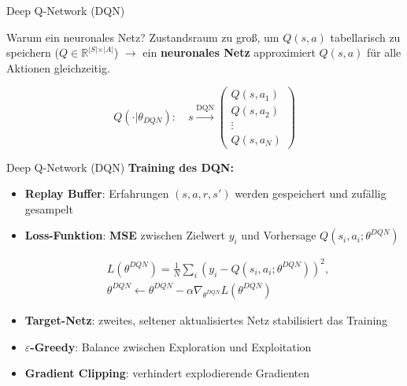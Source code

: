 \documentclass[aspectratio=169]{beamer}
\begin{document}
\begin{frame}{Deep Q-Network (DQN)}

  \begin{block}{Warum ein neuronales Netz?}
    Zustandsraum zu groß, um $Q(s,a)$ tabellarisch zu speichern ($Q \in \mathbb{R}^{\vert S \vert \times \vert A \vert}$)
    $\rightarrow$ ein \textbf{neuronales Netz} approximiert $Q(s,a)$ für alle Aktionen gleichzeitig.
  \end{block}

  \bigskip
  \begin{mdframed}[backgroundcolor=gray!20, , hidealllines=true]
    $$
      Q(\cdot \vert \theta_{DQN}): \quad s \xrightarrow{\text{DQN}}   \begin{pmatrix} Q(s, a_1) \\ Q(s, a_2) \\ \vdots \\ Q(s, a_N) \end{pmatrix}
    $$
\end{mdframed}

\end{frame}
\begin{frame}{Deep Q-Network (DQN)}
  \textbf{Training des DQN:}
  \begin{itemize}
    \item \textbf{Replay Buffer}: Erfahrungen $(s, a, r, s')$ werden gespeichert und zufällig
          gesampelt
    \item \textbf{Loss-Funktion}: \textbf{MSE} zwischen Zielwert $y_i$ und Vorhersage $Q(s_i, a_i; \theta^{DQN})$
  \begin{mdframed}[backgroundcolor=gray!20, , hidealllines=true]
    \begin{equation*}
        \begin{split}
             &L(\theta^{DQN}) = \frac{1}{N} \sum_{i} (y_i - Q(s_i, a_i; \theta^{DQN}))^2, \\
            &\theta^{DQN} \leftarrow \theta^{DQN} - \alpha \nabla_{\theta^{DQN}} L(\theta^{DQN})
        \end{split}
  \end{equation*}
  \end{mdframed} 
    \item \textbf{Target-Netz}: zweites, seltener aktualisiertes Netz stabilisiert das Training
    \item \textbf{$\varepsilon$-Greedy}: Balance zwischen Exploration und Exploitation
    \item \textbf{Gradient Clipping}: verhindert explodierende Gradienten
  \end{itemize}

\end{frame}
\end{document}
